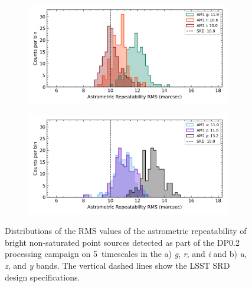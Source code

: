 \begin{figure}[h]
\begin{subfigure}{.5\textwidth}
    \centering
    \includegraphics[width=0.98\textwidth]{figures/dp02_am1_alltracts_gri}
\end{subfigure}
\begin{subfigure}{.5\textwidth}
    \centering
    \includegraphics[width=0.98\textwidth]{figures/dp02_am1_alltracts_uzy}
\end{subfigure}
\par\medskip
\caption{\label{fig:faro_dp02_distr_am1}
Distributions of the RMS values of the astrometric repeatability of bright non-saturated point sources detected as part of the DP0.2 processing campaign on 5\arcmin\, timescales  in the a) \emph{g}, \emph{r}, and \emph{i}  and  b) \emph{u}, \emph{z}, and \emph{y} bands.
The vertical dashed lines show the LSST SRD design specifications. }
\end{figure}
